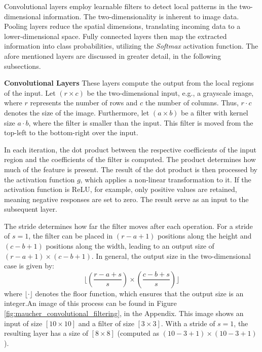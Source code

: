 Convolutional layers employ learnable filters to detect local patterns in the two-dimensional information. The two-dimensionality is inherent to image data. Pooling layers reduce the spatial dimensions, translating incoming data to a lower-dimensional space. Fully connected layers then map the extracted information into class probabilities, utilizing the \textit{Softmax} activation function. The afore mentioned layers are discussed in greater detail, in the following subsections.

\vspace{1em}

\textbf{Convolutional Layers}\label{theoretical_classification_conv_layers}
These layers compute the output from the local regions of the input. Let $(r \times c)$ be the two-dimensional input, e.g., a grayscale image, where $r$ represents the number of rows and $c$ the number of columns. Thus, $r \cdot c$ denotes the size of the image. Furthermore, let $(a \times b)$ be a filter with kernel size $a \cdot b$, where the filter is smaller than the input. This filter is moved from the top-left to the bottom-right over the input.

In each iteration, the dot product between the respective coefficients of the input region and the coefficients of the filter is computed. The product determines how much of the feature is present. The result of the dot product is then processed by the activation function $g$, which applies a non-linear transformation to it. If the activation function is ReLU, for example, only positive values are retained, meaning negative responses are set to zero. The result serve as an input to the subsequent layer.

The stride determines how far the filter moves after each operation. For a stride of $s = 1$, the filter can be placed in $(r - a + 1)$ positions along the height and $(c - b + 1)$ positions along the width, leading to an output size of $(r - a + 1) \times (c - b + 1)$. In general, the output size in the two-dimensional case is given by:
\[
\lfloor\left( \frac{r - a + s}{s} \right) \times \left( \frac{c - b + s}{s} \right)\rfloor
\]
where $\lfloor \cdot \rfloor$ denotes the floor function, which ensures that the output size is an integer.An image of this process can be found in Figure \ref{fig:maucher_convolutional_filtering}, in the Appendix. This image shows an input of size $[10 \times 10]$ and a filter of size $[3 \times 3]$. With a stride of $s = 1$, the resulting layer has a size of $[8 \times 8]$ (computed as $\left(10 - 3 + 1\right) \times \left(10 - 3 + 1\right)$). 

